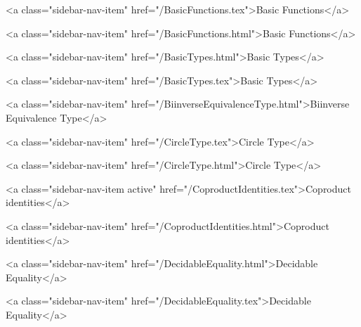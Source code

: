       
    
      
        
          <a class="sidebar-nav-item" href="/BasicFunctions.tex">Basic Functions</a>
        
      
    
      
        
          <a class="sidebar-nav-item" href="/BasicFunctions.html">Basic Functions</a>
        
      
    
      
        
          <a class="sidebar-nav-item" href="/BasicTypes.html">Basic Types</a>
        
      
    
      
        
          <a class="sidebar-nav-item" href="/BasicTypes.tex">Basic Types</a>
        
      
    
      
        
          <a class="sidebar-nav-item" href="/BiinverseEquivalenceType.html">Biinverse Equivalence Type</a>
        
      
    
      
        
          <a class="sidebar-nav-item" href="/CircleType.tex">Circle Type</a>
        
      
    
      
        
          <a class="sidebar-nav-item" href="/CircleType.html">Circle Type</a>
        
      
    
      
        
          <a class="sidebar-nav-item active" href="/CoproductIdentities.tex">Coproduct identities</a>
        
      
    
      
        
          <a class="sidebar-nav-item" href="/CoproductIdentities.html">Coproduct identities</a>
        
      
    
      
        
          <a class="sidebar-nav-item" href="/DecidableEquality.html">Decidable Equality</a>
        
      
    
      
        
          <a class="sidebar-nav-item" href="/DecidableEquality.tex">Decidable Equality</a>
        

